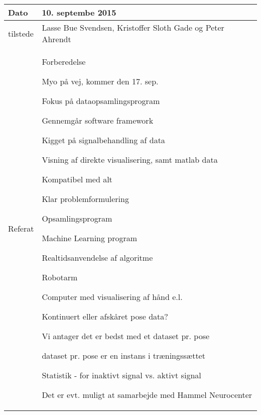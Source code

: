 \begin{center}
	\begin{tabular}{| l | p{10cm} |}
		\hline
		Dato		& 10. septembe 2015\\ \hline
		tilstede 	& Lasse Bue Svendsen, Kristoffer Sloth Gade og Peter Ahrendt\\ \hline
		Referat		& \vspace{-5mm}\begin{myEnumerate}
			\item Forberedelse
			\begin{myItemize}				
				\item Myo på vej, kommer den 17. sep.
				\item Fokus på dataopsamlingsprogram
				\begin{myItemize}
					\item Gennemgår software framework
					\item Kigget på signalbehandling af data
					\item Visning af direkte visualisering, samt matlab data
				\end{myItemize}
				\begin{myItemize}
					\item Kompatibel med alt
				\end{myItemize}
			\end{myItemize}
			\item Klar problemformulering
			\begin{myItemize}
				\item Opsamlingsprogram
				\item Machine Learning program
				\item Realtidsanvendelse af algoritme
				\begin{myItemize}
					\item Robotarm
					\item Computer med visualisering af hånd  e.l.
				\end{myItemize}
			\end{myItemize}
			\item Kontinuert eller afskåret pose data?
			\begin{myItemize}
				\item Vi antager det er bedst med et dataset pr. pose
				\item dataset pr. pose er en instans i træningssættet
				\item Statistik - for inaktivt signal vs. aktivt signal
			\end{myItemize}
			\item Det er evt. muligt at samarbejde med Hammel Neurocenter
		\end{myEnumerate}\\ 	
		\hline
	\end{tabular}
\end{center}

